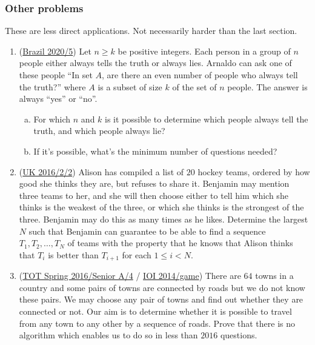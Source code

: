 \documentclass[11pt,paper=letter]{scrartcl}
\begin{document}
\subsubsection*{Other problems}

These are less direct applications. Not necessarily harder than the last section.

\begin{enumerate}[resume]

\item (\href{https://artofproblemsolving.com/community/c6h2494130p21012476}{Brazil 2020/5}) Let $n \ge k$ be positive integers. Each person in a group of $n$ people either always tells the truth or always lies. Arnaldo can ask one of these people ``In set $A$, are there an even number of people who always tell the truth?'' where $A$ is a subset of size $k$ of the set of $n$ people. The answer is always ``yes'' or ``no''.
\begin{enumerate}[(a)]
\item For which $n$ and $k$ is it possible to determine which people always tell the truth, and which people always lie?
\item If it's possible, what's the minimum number of questions needed?
\end{enumerate}
\hint{\ref{h:8}}

\item (\href{https://artofproblemsolving.com/community/c6h1191266p5811670}{UK 2016/2/2}) Alison has compiled a list of $20$ hockey teams, ordered by how good she thinks they are, but refuses to share it. Benjamin may mention three teams to her, and she will then choose either to tell him which she thinks is the weakest of the three, or which she thinks is the strongest of the three. Benjamin may do this as many times as he likes. Determine the largest $N$ such that Benjamin can guarantee to be able to find a sequence $T_{1}, T_{2}, \ldots, T_{N}$ of teams with the property that he knows that Alison thinks that $T_{i}$ is better than $T_{i+1}$ for each $1 \leq i < N$.
\hints{\ref{h:9} \ref{h:10}}

\item (\href{https://artofproblemsolving.com/community/c6h1312977p7040107}{TOT Spring 2016/Senior A/4} / \href{https://oj.uz/problem/view/IOI14_game}{IOI 2014/game}) There are $64$ towns in a country and some pairs of towns are connected by roads but we do not know these pairs. We may choose any pair of towns and find out whether they are connected or not. Our aim is to determine whether it is possible to travel from any town to any other by a sequence of roads. Prove that there is no algorithm which enables us to do so in less than $2016$ questions.
\hint{\ref{h:11}}


\end{enumerate}
\end{document}
